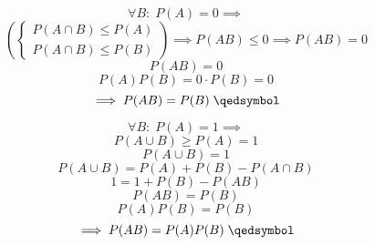 \documentclass[11pt, a4paper]{article} %
\begin{document}
$$\forall B: \; P(A)=0 \implies$$
$$\left(\begin{cases}
    P(A\cap B) \le P(A) \\
    P(A\cap B) \le P(B)
\end{cases}\right) \implies P(AB) \le 0 \implies P(AB) = 0$$
$$P(AB)=0$$
$$P(A)P(B) = 0\cdot P(B) = 0$$
$$\implies P(AB) = P(B) \; \qedsymbol$$

$$\forall B: \; P(A)=1 \implies$$
$$P(A\cup B) \ge P(A) = 1 $$
$$P(A\cup B) = 1$$
$$P(A\cup B) = P(A) + P(B) - P(A\cap B)$$
$$1 = 1 + P(B) - P(AB)$$
$$P(AB) = P(B)$$
$$P(A)P(B) = P(B)$$
$$\implies P(AB) = P(A)P(B) \; \qedsymbol$$
\end{document}
